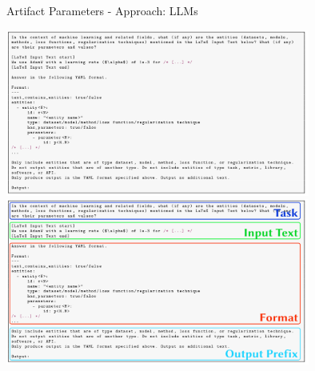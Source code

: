 \documentclass[en,16:9,smallfoot]{sdqbeamer}
\begin{document}
   \begin{frame}{Artifact Parameters - Approach: LLMs}
      \begin{overprint}
           \centering\includegraphics[width=0.75\textwidth]{imgs/prompt}
           \centering\includegraphics[width=0.75\textwidth]{imgs/prompt_marked}
      \end{overprint}
   \end{frame}
\end{document}
